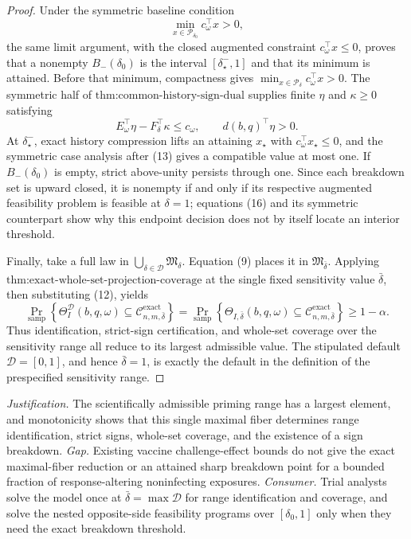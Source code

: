 \documentclass{article}
\begin{document}
\begin{proof}
Under the symmetric baseline condition
\[
 \min_{x\in\mathcal P_{\delta_0}}c_\omega^{\top}x>0,
\tag{19}
\]
the same limit argument, with the closed augmented constraint \(c_\omega^{\top}x\leq0\), proves that a nonempty \(B_-(\delta_0)\) is the interval \([\delta_\star^-,1]\) and that its minimum is attained.  Before that minimum, compactness gives \(\min_{x\in\mathcal P_\delta}c_\omega^{\top}x>0\).  The symmetric half of \(\text{thm:common-history-sign-dual}\) supplies finite \(\eta\) and \(\kappa\geq0\) satisfying
\[
 E_\omega^{\top}\eta-F_\delta^{\top}\kappa\leq c_\omega,
 \qquad d(b,q)^{\top}\eta>0.
\tag{20}
\]
At \(\delta_\star^-\), exact history compression lifts an attaining \(x_\star\) with \(c_\omega^{\top}x_\star\leq0\), and the symmetric case analysis after (13) gives a compatible value at most one.  If \(B_-(\delta_0)\) is empty, strict above-unity persists through one.  Since each breakdown set is upward closed, it is nonempty if and only if its respective augmented feasibility problem is feasible at \(\delta=1\); equations (16) and its symmetric counterpart show why this endpoint decision does not by itself locate an interior threshold.

Finally, take a full law in \(\bigcup_{\delta\in\mathcal D}\mathfrak M_\delta\).  Equation (9) places it in \(\mathfrak M_{\bar\delta}\).  Applying \(\text{thm:exact-whole-set-projection-coverage}\) at the single fixed sensitivity value \(\bar\delta\), then substituting (12), yields
\[
 \Pr_{\mathrm{samp}}\!\left\{
 \Theta_I^{\mathcal D}(b,q,\omega)
 \subseteq\mathcal C_{n,m,\bar\delta}^{\mathrm{exact}}
 \right\}
 =
 \Pr_{\mathrm{samp}}\!\left\{
 \Theta_{I,\bar\delta}(b,q,\omega)
 \subseteq\mathcal C_{n,m,\bar\delta}^{\mathrm{exact}}
 \right\}
 \geq1-\alpha.
\tag{21}
\]
Thus identification, strict-sign certification, and whole-set coverage over the sensitivity range all reduce to its largest admissible value.  The stipulated default \(\mathcal D=[0,1]\), and hence \(\bar\delta=1\), is exactly the default in the definition of the prespecified sensitivity range.
\end{proof}
\par\smallskip\noindent \textit{Justification.} The scientifically admissible priming range has a largest element, and monotonicity shows that this single maximal fiber determines range identification, strict signs, whole-set coverage, and the existence of a sign breakdown. \textit{Gap.} Existing vaccine challenge-effect bounds do not give the exact maximal-fiber reduction or an attained sharp breakdown point for a bounded fraction of response-altering noninfecting exposures. \textit{Consumer.} Trial analysts solve the model once at \(\bar\delta=\max\mathcal D\) for range identification and coverage, and solve the nested opposite-side feasibility programs over \([\delta_0,1]\) only when they need the exact breakdown threshold.
\end{document}
